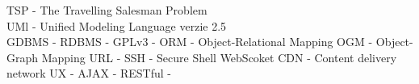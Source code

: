 TSP - The Travelling Salesman Problem\\
UMl - Unified Modeling Language verzie 2.5\\
GDBMS -
RDBMS - 
GPLv3 - 
ORM - Object-Relational Mapping
OGM - Object-Graph Mapping
URL - 
SSH - Secure Shell
WebScoket
CDN - Content delivery network
UX -
AJAX - 
RESTful -
